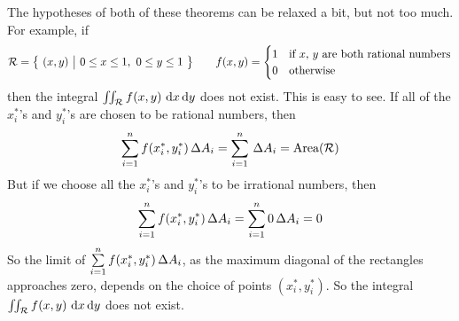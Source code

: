 The hypotheses of both of these theorems can be relaxed a bit, but not
too much. For example, if
\begin{equation*}
\mathcal{R}=\big\{ \ (x,y)\ \big|\ 0\le x\le 1,\ 0\le y\le 1\ \big\}\qquad
f(x,y)=\begin{cases}
           1&\text{if $x$, $y$ are both rational numbers} \\
           0&\text{otherwise}
      \end{cases}
\end{equation*}
then the integral $\dblInt_\cR f(x,y)\ \dee{x}\,\dee{y}$ does not exist. This
is easy to see. If all of the $x_i^*$'s and $y_i^*$'s are chosen to be rational
numbers, then
\begin{equation*}
\sum_{i=1}^n f(x_i^*,y_i^*)\,\Delta A_i
=\sum_{i=1}^n \,\Delta A_i
=\text{Area}(\mathcal{R})
\end{equation*}
But if we choose all  the $x_i^*$'s and $y_i^*$'s to be irrational numbers, then
\begin{equation*}
\sum_{i=1}^n f(x_i^*,y_i^*)\,\Delta A_i
=\sum_{i=1}^n 0\,\Delta A_i
=0
\end{equation*}
So the limit of $\sum\limits_{i=1}^n f(x_i^*,y_i^*)\,\Delta A_i$, 
as the maximum diagonal of the rectangles approaches zero,
depends on the choice of points $(x_i^*,y_i^*)$. So the integral
$\dblInt_\cR f(x,y)\ \dee{x}\,\dee{y}$ does not exist.

